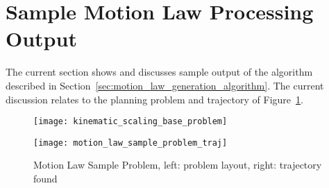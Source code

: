 \section{Sample Motion Law Processing Output}%
\label{sec:sample_motion_law_processing_output}

	The current section shows and discusses sample output of the algorithm
	described in Section~\ref{sec:motion_law_generation_algorithm}. The current
	discussion relates to the planning problem and trajectory of
	Figure~\ref{fig:motion_law_sample_problem}.

	\begin{figure}[hb]
		\begin{minipage}{0.5\textwidth}
			\centering
			\texttt{[image: kinematic\_scaling\_base\_problem]}
		\end{minipage}
		\begin{minipage}{0.5\textwidth}
			\centering
			\texttt{[image: motion\_law\_sample\_problem\_traj]}
		\end{minipage}
		\caption[Motion Law Sample Problem]{Motion Law Sample Problem,
		left: problem layout, right: trajectory found}
		\label{fig:motion_law_sample_problem}
	\end{figure}

